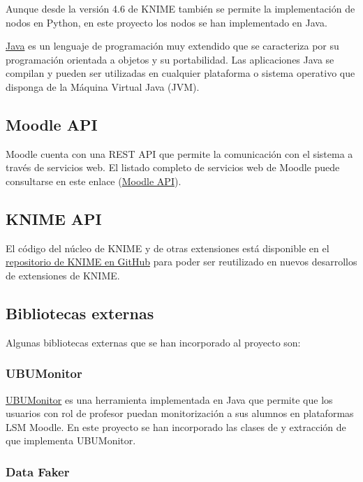 Aunque desde la versión 4.6 de KNIME también se permite la implementación de nodos en Python, en este proyecto los nodos se 
han implementado en Java. 
\

\href{https://www.java.com/}{Java} es un lenguaje de programación muy extendido que se caracteriza por su programación orientada a objetos y su portabilidad. Las 
aplicaciones Java se compilan y pueden ser utilizadas en cualquier plataforma o sistema operativo que disponga de la Máquina 
Virtual Java (JVM).

\subsection{Moodle API}

Moodle cuenta con una REST API que permite la comunicación con el sistema a través de servicios web. El listado completo de servicios
web de Moodle puede consultarse en este enlace (\href{https://docs.moodle.org/dev/Web_service_API_functions}{Moodle API}). 


\subsection{KNIME API}

El código del núcleo de KNIME y de otras extensiones está disponible en el \href{https://github.com/knime/}{repositorio de KNIME en GitHub} para poder ser reutilizado en nuevos desarrollos de extensiones
de KNIME. 

\subsection{Bibliotecas externas}

Algunas bibliotecas externas que se han incorporado al proyecto son: 

\subsubsection{UBUMonitor}

\href{https://github.com/yjx0003/UBUMonitor}{UBUMonitor} \cite{marticorena2022ubumonitor} es una herramienta implementada en Java que permite que los usuarios con 
rol de profesor puedan monitorización a sus alumnos en plataformas LSM Moodle. En este proyecto se han incorporado las clases de  y
 extracción de  que implementa UBUMonitor.

\subsubsection{Data Faker}

